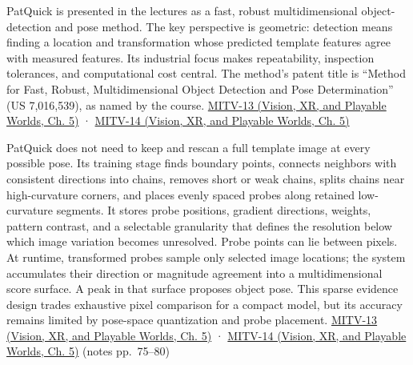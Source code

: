PatQuick is presented in the lectures as a fast, robust multidimensional object-detection and pose method. The key perspective is geometric: detection means finding a location and transformation whose predicted template features agree with measured features. Its industrial focus makes repeatability, inspection tolerances, and computational cost central. The method's patent title is ``Method for Fast, Robust, Multidimensional Object Detection and Pose Determination'' (US 7,016,539), as named by the course. \href{../07-Vision-XR-and-Playable-Worlds/main.pdf\#nameddest=04-visual-computing-ii-ch036-mitv-13---object-detection-recognition-and-pose-determination-patquick-us-7016539}{MITV-13 (Vision, XR, and Playable Worlds, Ch. 5)} · \href{../07-Vision-XR-and-Playable-Worlds/main.pdf\#nameddest=04-visual-computing-ii-ch036-mitv-14---inspection-in-patquick-hough-transform-homography-position-determination-multi-scale}{MITV-14 (Vision, XR, and Playable Worlds, Ch. 5)}

PatQuick does not need to keep and rescan a full template image at every possible pose. Its training stage finds boundary points, connects neighbors with consistent directions into chains, removes short or weak chains, splits chains near high-curvature corners, and places evenly spaced probes along retained low-curvature segments. It stores probe positions, gradient directions, weights, pattern contrast, and a selectable granularity that defines the resolution below which image variation becomes unresolved. Probe points can lie between pixels. At runtime, transformed probes sample only selected image locations; the system accumulates their direction or magnitude agreement into a multidimensional score surface. A peak in that surface proposes object pose. This sparse evidence design trades exhaustive pixel comparison for a compact model, but its accuracy remains limited by pose-space quantization and probe placement. \href{../07-Vision-XR-and-Playable-Worlds/main.pdf\#nameddest=04-visual-computing-ii-ch036-mitv-13---object-detection-recognition-and-pose-determination-patquick-us-7016539}{MITV-13 (Vision, XR, and Playable Worlds, Ch. 5)} · \href{../07-Vision-XR-and-Playable-Worlds/main.pdf\#nameddest=04-visual-computing-ii-ch036-mitv-14---inspection-in-patquick-hough-transform-homography-position-determination-multi-scale}{MITV-14 (Vision, XR, and Playable Worlds, Ch. 5)} (notes pp.~75--80)

